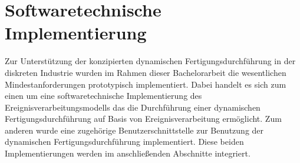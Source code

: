 \chapter{Softwaretechnische Implementierung}\label{ch:Implementierung}
Zur Unterstützung der konzipierten dynamischen Fertigungsdurchführung in der diskreten Industrie wurden im Rahmen dieser Bachelorarbeit die wesentlichen Mindestanforderungen prototypisch implementiert. 
Dabei handelt es sich zum einen um eine softwaretechnische Implementierung des Ereignisverarbeitungsmodells das die Durchführung einer dynamischen Fertigungsdurchführung auf Basis von Ereignisverarbeitung ermöglicht. 
Zum anderen wurde eine zugehörige Benutzerschnittstelle zur Benutzung der dynamischen Fertigungsdurchführung implementiert. Diese beiden Implementierungen werden im anschließenden Abschnitte integriert.


